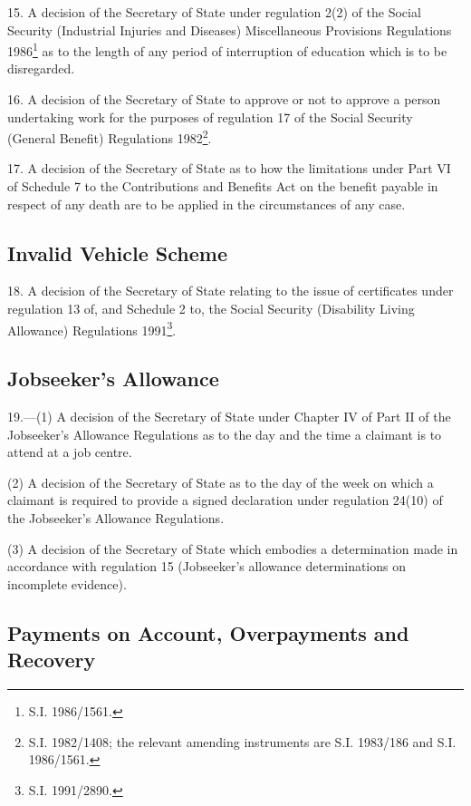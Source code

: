 \documentclass[12pt,a4paper]{article}
\begin{document}
\medskip

15.  A decision of the Secretary of State under regulation 2(2) of the Social Security (Industrial Injuries and Diseases) Miscellaneous Provisions Regulations 1986\footnote{\frenchspacing S.I. 1986/1561.} as to the length of any period of interruption of education which is to be disregarded.

\medskip

16.  A decision of the Secretary of State to approve or not to approve a person undertaking work for the purposes of regulation 17 of the Social Security (General Benefit) Regulations 1982\footnote{\frenchspacing S.I. 1982/1408; the relevant amending instruments are S.I. 1983/186 and S.I. 1986/1561.}.

\medskip

17.  A decision of the Secretary of State as to how the limitations under Part VI of Schedule 7 to the Contributions and Benefits Act on the benefit payable in respect of any death are to be applied in the circumstances of any case.

\subsection*{Invalid Vehicle Scheme}

18.  A decision of the Secretary of State relating to the issue of certificates under regulation 13 of, and Schedule 2 to, the Social Security (Disability Living Allowance) Regulations 1991\footnote{\frenchspacing S.I. 1991/2890.}.

\subsection*{Jobseeker’s Allowance}

19.—(1) A decision of the Secretary of State under Chapter IV of Part II of the Jobseeker’s Allowance Regulations as to the day and the time a claimant is to attend at a job centre.

(2) A decision of the Secretary of State as to the day of the week on which a claimant is required to provide a signed declaration under regulation 24(10) of the Jobseeker’s Allowance Regulations.

(3) A decision of the Secretary of State which embodies a determination made in accordance with regulation 15 (Jobseeker’s allowance determinations on incomplete evidence).

\subsection*{Payments on Account, Overpayments and Recovery}
\end{document}
